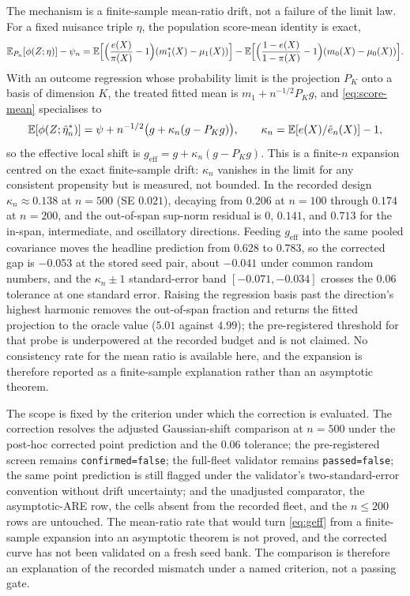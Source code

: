 The mechanism is a finite-sample mean-ratio drift, not a failure of the limit law. For a fixed nuisance triple $\eta$, the population score-mean identity is exact,
\begin{equation}
\mathbb{E}_{P_n}[\phi(Z;\eta)]-\psi_n
=\mathbb{E}\Bigl[\Bigl(\frac{e(X)}{\pi(X)}-1\Bigr)(m_1^\ast(X)-\mu_1(X))\Bigr]
-\mathbb{E}\Bigl[\Bigl(\frac{1-e(X)}{1-\pi(X)}-1\Bigr)(m_0(X)-\mu_0(X))\Bigr].
\label{eq:score-mean}
\end{equation}
With an outcome regression whose probability limit is the projection $P_K$ onto a basis of dimension $K$, the treated fitted mean is $m_1+n^{-1/2}P_Kg$, and \eqref{eq:score-mean} specialises to
\begin{equation}
\mathbb{E}[\phi(Z;\hat\eta_n^\ast)]=\psi+n^{-1/2}\bigl(g+\kappa_n(g-P_Kg)\bigr),
\qquad
\kappa_n=\mathbb{E}[e(X)/\hat e_n(X)]-1,
\label{eq:geff}
\end{equation}
so the effective local shift is $g_{\mathrm{eff}}=g+\kappa_n(g-P_Kg)$. This is a finite-$n$ expansion centred on the exact finite-sample drift: $\kappa_n$ vanishes in the limit for any consistent propensity but is measured, not bounded. In the recorded design $\kappa_n\approx0.138$ at $n=500$ (SE $0.021$), decaying from $0.206$ at $n=100$ through $0.174$ at $n=200$, and the out-of-span sup-norm residual is $0$, $0.141$, and $0.713$ for the in-span, intermediate, and oscillatory directions. Feeding $g_{\mathrm{eff}}$ into the same pooled covariance moves the headline prediction from $0.628$ to $0.783$, so the corrected gap is $-0.053$ at the stored seed pair, about $-0.041$ under common random numbers, and the $\kappa_n\pm1$ standard-error band $[-0.071,-0.034]$ crosses the $0.06$ tolerance at one standard error. Raising the regression basis past the direction's highest harmonic removes the out-of-span fraction and returns the fitted projection to the oracle value ($5.01$ against $4.99$); the pre-registered threshold for that probe is underpowered at the recorded budget and is not claimed. No consistency rate for the mean ratio is available here, and the expansion is therefore reported as a finite-sample explanation rather than an asymptotic theorem.

The scope is fixed by the criterion under which the correction is evaluated. The correction resolves the adjusted Gaussian-shift comparison at $n=500$ under the post-hoc corrected point prediction and the $0.06$ tolerance; the pre-registered screen remains \texttt{confirmed=false}; the full-fleet validator remains \texttt{passed=false}; the same point prediction is still flagged under the validator's two-standard-error convention without drift uncertainty; and the unadjusted comparator, the asymptotic-ARE row, the cells absent from the recorded fleet, and the $n\le200$ rows are untouched. The mean-ratio rate that would turn \eqref{eq:geff} from a finite-sample expansion into an asymptotic theorem is not proved, and the corrected curve has not been validated on a fresh seed bank. The comparison is therefore an explanation of the recorded mismatch under a named criterion, not a passing gate.

